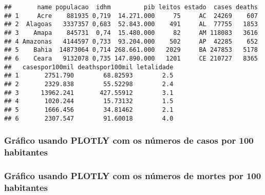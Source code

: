 \documentclass[
]{article}
\newenvironment{Shaded}{\begin{snugshade}}{\end{snugshade}}
\newcommand{\DataTypeTok}[1]{\textcolor[rgb]{0.13,0.29,0.53}{#1}}
\newcommand{\KeywordTok}[1]{\textcolor[rgb]{0.13,0.29,0.53}{\textbf{#1}}}
\newcommand{\NormalTok}[1]{#1}
\newcommand{\OperatorTok}[1]{\textcolor[rgb]{0.81,0.36,0.00}{\textbf{#1}}}
\newcommand{\StringTok}[1]{\textcolor[rgb]{0.31,0.60,0.02}{#1}}
\begin{document}
\begin{verbatim}
##       name populacao  idhm         pib leitos estado  cases deaths
## 1     Acre    881935 0,719  14.271.000     75     AC  24269    607
## 2  Alagoas   3337357 0,683  52.843.000    491     AL  77755   1853
## 3    Amapa    845731  0,74  15.480.000     82     AM 118083   3616
## 4 Amazonas   4144597 0,733  93.204.000    502     AP  42285    652
## 5    Bahia  14873064 0,714 268.661.000   2029     BA 247853   5178
## 6    Ceara   9132078 0,735 147.890.000   1201     CE 210727   8365
##   casespor100mil deathspor100mil letalidade
## 1       2751.790        68.82593        2.5
## 2       2329.838        55.52298        2.4
## 3      13962.241       427.55912        3.1
## 4       1020.244        15.73132        1.5
## 5       1666.456        34.81462        2.1
## 6       2307.547        91.60018        4.0
\end{verbatim}

\hypertarget{gruxe1fico-usando-plotly-com-os-nuxfameros-de-casos-por-100-habitantes}{%
\subsubsection{Gráfico usando PLOTLY com os números de casos por 100
habitantes}\label{gruxe1fico-usando-plotly-com-os-nuxfameros-de-casos-por-100-habitantes}}

\begin{Shaded}
\end{Shaded}

\hypertarget{htmlwidget-f646bf70db21ffc3e817}{}
\begin{plotly}

\end{plotly}

\hypertarget{gruxe1fico-usando-plotly-com-os-nuxfameros-de-mortes-por-100-habitantes}{%
\subsubsection{Gráfico usando PLOTLY com os números de mortes por 100
habitantes}\label{gruxe1fico-usando-plotly-com-os-nuxfameros-de-mortes-por-100-habitantes}}
\end{document}
